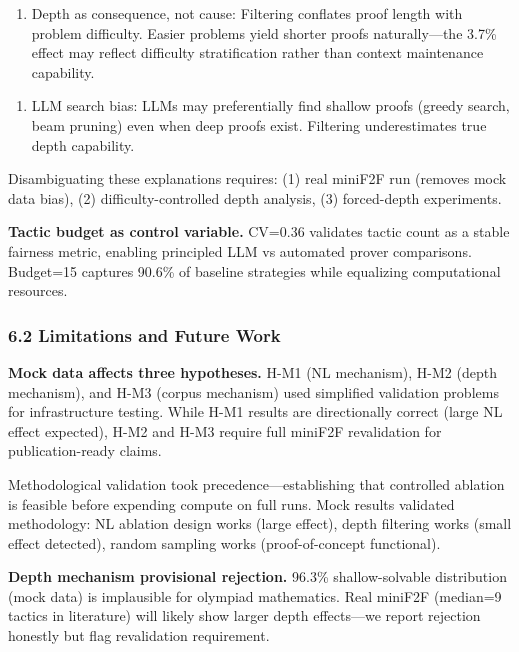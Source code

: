 \begin{enumerate}
\item Depth as consequence, not cause: Filtering conflates proof length with problem difficulty. Easier problems yield shorter proofs naturally---the 3.7\% effect may reflect difficulty stratification rather than context maintenance capability.
\end{enumerate}

\begin{enumerate}
\item LLM search bias: LLMs may preferentially find shallow proofs (greedy search, beam pruning) even when deep proofs exist. Filtering underestimates true depth capability.
\end{enumerate}

Disambiguating these explanations requires: (1) real miniF2F run (removes mock data bias), (2) difficulty-controlled depth analysis, (3) forced-depth experiments.

\textbf{Tactic budget as control variable.} CV=0.36 validates tactic count as a stable fairness metric, enabling principled LLM vs automated prover comparisons. Budget=15 captures 90.6\% of baseline strategies while equalizing computational resources.

\subsubsection{6.2 Limitations and Future Work}

\textbf{Mock data affects three hypotheses.} H-M1 (NL mechanism), H-M2 (depth mechanism), and H-M3 (corpus mechanism) used simplified validation problems for infrastructure testing. While H-M1 results are directionally correct (large NL effect expected), H-M2 and H-M3 require full miniF2F revalidation for publication-ready claims.

Methodological validation took precedence---establishing that controlled ablation is feasible before expending compute on full runs. Mock results validated methodology: NL ablation design works (large effect), depth filtering works (small effect detected), random sampling works (proof-of-concept functional).

\textbf{Depth mechanism provisional rejection.} 96.3\% shallow-solvable distribution (mock data) is implausible for olympiad mathematics. Real miniF2F (median=9 tactics in literature) will likely show larger depth effects---we report rejection honestly but flag revalidation requirement.

